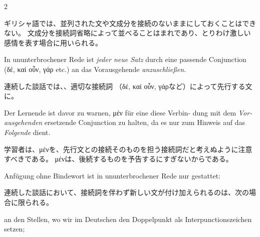 \begin{paracol}{2}
\begin{enumerate}[leftmargin=0pt,rightmargin=0pt,listparindent =1cm,labelindent=1cm,labelsep=1ex,labelwidth={*},itemindent={*},align=left]
\begin{japanese}
ギリシャ語では、並列された文や文成分を接続のないままにしておくことはできない。
文成分を接続詞省略によって並べることはまれであり、とりわけ激しい感情を表す場合に用いられる。
\end{japanese}
\switchcolumn*

\begin{german}
In ununterbrochener Rede ist \emph{jeder neue Satz} durch eine passende
Conjunction (\textgreek[variant=ancient]{δέ, καί οὖν, γάρ} etc.) an
das Voraus\textcompwordmark{}gehende \emph{anzuschließen.}
\end{german}
\switchcolumn

\begin{japanese}
連続した談話では、、適切な接続詞
（\textgreek[variant=ancient]{δέ, καί οὖν, γάρ}など）によって先行する文に。
\end{japanese}
\switchcolumn*

\begin{german}
Der Lernende ist davor zu warnen, \textgreek[variant=ancient]{μέν}
für eine diese Verbin- dung mit dem \emph{Voraus\textcompwordmark{}gehenden}
ersetzende Conjunction zu halten, da es nur zum Hinweis auf das \emph{Folgende}
dient.
\end{german}
\switchcolumn

\begin{japanese}
学習者は、\textgreek[variant=ancient]{μέν}を、先行文との接続そのものを担う接続詞だと考えぬように注意すべきである。
\textgreek[variant=ancient]{μέν}は、後続するものを予告するにすぎないからである。
\end{japanese}
\switchcolumn*

\begin{german}
Anfügung ohne Bindewort ist in ununterbrochener Rede nur gestattet:
\end{german}
\switchcolumn

\begin{japanese}
連続した談話において、接続詞を伴わず新しい文が付け加えられるのは、次の場合に限られる。
\end{japanese}
\switchcolumn*

\begin{enumerate}
\begin{german}
\item an den Stellen, wo wir im Deutschen den Doppelpunkt als Interpunctions\textcompwordmark{}zeichen
setzen;
\end{german}
\switchcolumn


\end{enumerate}
\end{enumerate}
\end{paracol}

